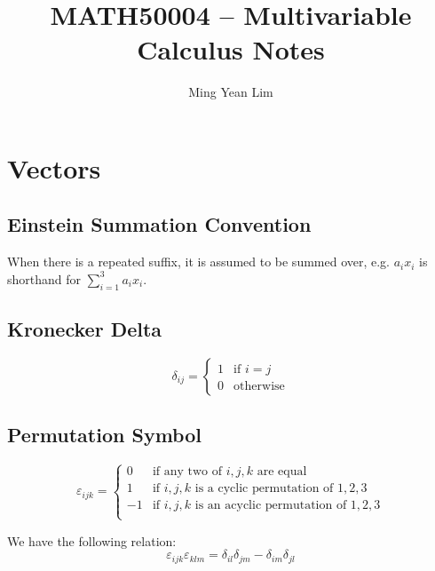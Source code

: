 \documentclass{article}
\title{MATH50004 -- Multivariable Calculus Notes}
\author{Ming Yean Lim}
\date{}
\theoremstyle{definition}
\theoremstyle{definition}
\theoremstyle{remark}
\begin{document}
\maketitle

\section{Vectors}

\subsection{Einstein Summation Convention}

When there is a repeated suffix, it is assumed to be summed over, e.g. $a_i x_i$ is shorthand for $\sum_{i=1}^{3} a_i x_i$.

\subsection{Kronecker Delta}

\begin{equation*}
    \delta_{ij} =
        \begin{cases}
            1 & \text{if } i = j \\
            0 & \text{otherwise}
        \end{cases}
\end{equation*}

\subsection{Permutation Symbol}

\begin{equation*}
    \varepsilon_{ijk} =
        \begin{cases}
            0  & \text{if any two of } i, j, k \text{ are equal} \\
            1  & \text{if } i, j, k \text{ is a cyclic permutation of } 1, 2, 3 \\
            -1 & \text{if } i, j, k \text{ is an acyclic permutation of } 1, 2, 3 \\
        \end{cases}
\end{equation*}

We have the following relation:
\begin{equation*}
    \varepsilon_{ijk} \varepsilon_{klm} = \delta_{il} \delta_{jm} - \delta_{im} \delta_{jl}
\end{equation*}
\end{document}
